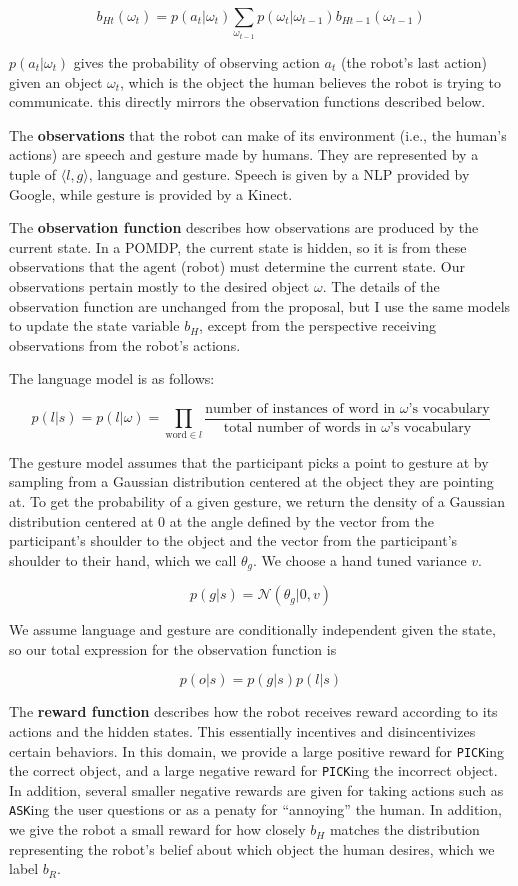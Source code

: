 \documentclass{article}
\begin{document}
$$b_{Ht}(\omega_t) = p(a_t | \omega_t) \sum_{\omega_{t-1}} p(\omega_t|\omega_{t-1}) b_{Ht-1}(\omega_{t-1})$$

$p(a_t | \omega_t)$ gives the probability of observing action $a_t$ (the robot's last action) given an object $\omega_t$, which is the object the human believes the robot is trying to communicate. this directly mirrors the observation functions described below. 

The \textbf{observations} that the robot can make of its environment (i.e., the human's actions) are speech and gesture made by humans. They are represented by a tuple of $\langle l, g \rangle$, language and gesture. Speech is given by a NLP provided by Google, while gesture is provided by a Kinect. 

The \textbf{observation function} describes how observations are produced by the current state. In a POMDP, the current state is hidden, so it is from these observations that the agent (robot) must determine the current state. Our observations pertain mostly to the desired object $\omega$. The details of the observation function are unchanged from the proposal, but I use the same models to update the state variable $b_H$, except from the perspective receiving observations from the robot's actions. 

The language model is as follows: 

$$ p(l|s) = p(l|\omega) = \prod_{\text{word} \in l} \frac{\text{number of instances of word in $\omega$'s vocabulary}}{\text{total number of words in $\omega$'s vocabulary}}$$

The gesture model assumes that the participant picks a point to gesture at by sampling from a Gaussian distribution centered at the object they are pointing at. To get the probability of a given gesture, we return the density of a Gaussian distribution centered at 0 at the angle defined by the vector from the participant's shoulder to the object and the vector from the participant's shoulder to their hand, which we call $\theta_g$. We choose a hand tuned variance $v$. 

$$ p(g|s) = \mathcal{N}(\theta_g| 0, v)$$

We assume language and gesture are conditionally independent given the state, so our total expression for the observation function is 

$$ p(o|s) = p(g|s) p(l|s)$$


The \textbf{reward function} describes how the robot receives reward according to its actions and the hidden states. This essentially incentives and disincentivizes certain behaviors. In this domain, we provide a large positive reward for \texttt{PICK}ing the correct object, and a large negative reward for \texttt{PICK}ing the incorrect object. In addition, several smaller negative rewards are given for taking actions such as \texttt{ASK}ing the user questions or as a penaty for ``annoying'' the human. In addition, we give the robot a small reward for how closely $b_H$ matches the distribution representing the robot's belief about which object the human desires, which we label $b_R$. 
\end{document}
